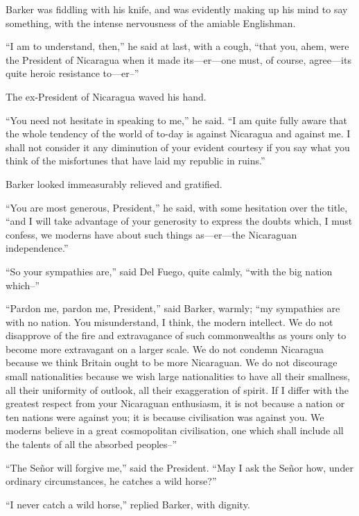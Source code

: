 \documentclass{book}
\begin{document}
Barker was fiddling with his knife, and was evidently making up his mind to say something, with the intense nervousness of the amiable Englishman.

“I am to understand, then,” he said at last, with a cough, “that you, ahem, were the President of Nicaragua when it made its—er—one must, of course, agree—its quite heroic resistance to—er–”

The ex-President of Nicaragua waved his hand.

“You need not hesitate in speaking to me,” he said. “I am quite fully aware that the whole tendency of the world of to-day is against Nicaragua and against me. I shall not consider it any diminution of your evident courtesy if you say what you think of the misfortunes that have laid my republic in ruins.”

Barker looked immeasurably relieved and gratified.

“You are most generous, President,” he said, with some hesitation over the title, “and I will take advantage of your generosity to express the doubts which, I must confess, we moderns have about such things as—er—the Nicaraguan independence.”

“So your sympathies are,” said Del Fuego, quite calmly, “with the big nation which–”

“Pardon me, pardon me, President,” said Barker, warmly; “my sympathies are with no nation. You misunderstand, I think, the modern intellect. We do not disapprove of the fire and extravagance of such commonwealths as yours only to become more extravagant on a larger scale. We do not condemn Nicaragua because we think Britain ought to be more Nicaraguan. We do not discourage small nationalities because we wish large nationalities to have all their smallness, all their uniformity of outlook, all their exaggeration of spirit. If I differ with the greatest respect from your Nicaraguan enthusiasm, it is not because a nation or ten nations were against you; it is because civilisation was against you. We moderns believe in a great cosmopolitan civilisation, one which shall include all the talents of all the absorbed peoples–”

“The Señor will forgive me,” said the President. “May I ask the Señor how, under ordinary circumstances, he catches a wild horse?”

“I never catch a wild horse,” replied Barker, with dignity.
\end{document}
